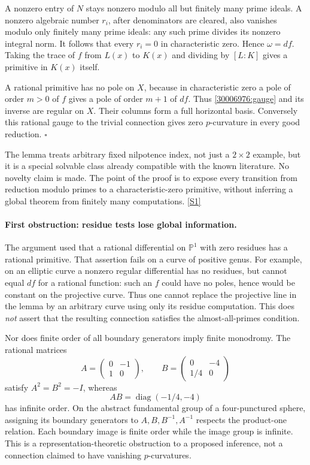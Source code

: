 \documentclass[11pt,a4paper]{article}
\newcommand{\PP}{\mathbb P}
\newcommand{\sref}[2]{\hyperlink{source:#1:#2}{[S#2]}}
\numberwithin{equation}{section}
\begin{document}
A nonzero entry of $N$ stays nonzero modulo all but finitely many prime
ideals. A nonzero algebraic number $r_i$, after denominators are cleared,
also vanishes modulo only finitely many prime ideals: any such prime divides
its nonzero integral norm. It follows that every $r_i=0$ in characteristic
zero. Hence $\omega=df$. Taking the trace of $f$ from $L(x)$ to $K(x)$ and
dividing by $[L:K]$ gives a primitive in $K(x)$ itself.

A rational primitive has no pole on $X$, because in characteristic zero a
pole of order $m>0$ of $f$ gives a pole of order $m+1$ of $df$. Thus
\eqref{30006976:gauge} and its inverse are regular on $X$. Their columns form a
full horizontal basis. Conversely this rational gauge to the trivial
connection gives zero $p$-curvature in every good reduction. $\square$

The lemma treats arbitrary fixed nilpotence index, not just a $2\times2$
example, but it is a special solvable class already compatible with the
known literature. No novelty claim is made. The point of the proof is to
expose every transition from reduction modulo primes to a characteristic-zero
primitive, without inferring a global theorem from finitely many computations.
\sref{30006976}{1}

\paragraph{First obstruction: residue tests lose global information.}
The argument used that a rational differential on $\PP^1$ with zero residues
has a rational primitive. That assertion fails on a curve of positive genus.
For example, on an elliptic curve a nonzero regular differential has no
residues, but cannot equal $df$ for a rational function: such an $f$ could
have no poles, hence would be constant on the projective curve. Thus one
cannot replace the projective line in the lemma by an arbitrary curve using
only its residue computation. This does \emph{not} assert that the resulting
connection satisfies the almost-all-primes condition.

Nor does finite order of all boundary generators imply finite monodromy.
The rational matrices
\begin{equation}\label{30006976:matrices}
 A=\begin{pmatrix}0&-1\\1&0\end{pmatrix},\qquad
 B=\begin{pmatrix}0&-4\\1/4&0\end{pmatrix}
\end{equation}
satisfy $A^2=B^2=-I$, whereas
\[
 AB=\operatorname{diag}(-1/4,-4)
\]
has infinite order. On the abstract fundamental group of a four-punctured
sphere, assigning its boundary generators to $A,B,B^{-1},A^{-1}$ respects
the product-one relation. Each boundary image is finite order while the
image group is infinite. This is a representation-theoretic obstruction to
a proposed inference, not a connection claimed to have vanishing
$p$-curvatures.
\end{document}
